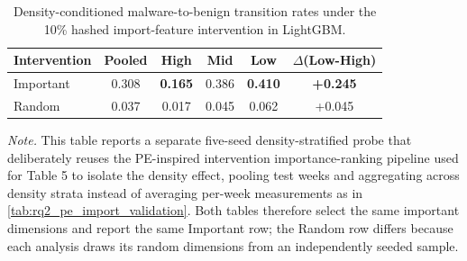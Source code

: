 \begin{table}[t]
\centering
\caption{Density-conditioned malware-to-benign transition rates under the 10\% hashed import-feature intervention in LightGBM.}
\label{tab:density_import_intervention}
\small
\setlength{\tabcolsep}{5pt}
\begin{tabular}{lccccc}
\toprule
\textbf{Intervention} & \textbf{Pooled} & \textbf{High} & \textbf{Mid} & \textbf{Low} & \textbf{$\Delta$(Low-High)}\\
\midrule
Important & 0.308 & \textbf{0.165} & 0.386 & \textbf{0.410} & \textbf{+0.245} \\
Random    & 0.037 & 0.017 & 0.045 & 0.062 & +0.045 \\
\bottomrule
\end{tabular}

\begin{minipage}{\linewidth}
\footnotesize
\textit{Note.}
This table reports a separate five-seed density-stratified probe that
deliberately reuses the PE-inspired intervention importance-ranking pipeline
used for Table 5 to isolate the density effect, pooling test weeks and
aggregating across density strata
instead of averaging per-week measurements as in \autoref{tab:rq2_pe_import_validation}.
Both tables therefore select the same important dimensions and report the
same Important row; the Random row differs because each analysis draws its
random dimensions from an independently seeded sample.
\end{minipage}
\end{table}

